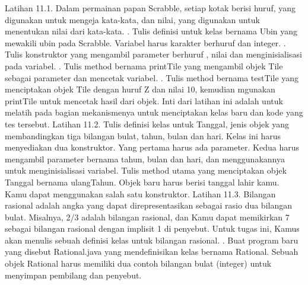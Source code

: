 Latihan 11.1. Dalam permainan papan Scrabble, setiap kotak berisi huruf, yang digunakan untuk mengeja kata-kata, dan nilai, yang digunakan untuk menentukan nilai dari kata-kata.
. Tulis definisi untuk kelas bernama Ubin yang mewakili ubin pada Scrabble. \newline
Variabel harus karakter berhuruf dan integer.
\newline {}. Tulis konstruktor yang mengambil parameter berhuruf , nilai dan menginisialisasi pada variabel.
\newline {}. Tulis method bernama printTile yang mengambil objek Tile sebagai parameter dan mencetak variabel.
\newline {}. Tulis method bernama testTile yang menciptakan objek Tile dengan huruf Z dan nilai 10, kemudian mgunakan printTile untuk mencetak hasil dari objek.
\newline \newline
Inti dari latihan ini adalah untuk melatih pada bagian mekanismenya untuk menciptakan kelas baru dan kode yang tes tersebut.
\newline \newline
Latihan 11.2. Tulis definisi kelas untuk Tanggal, jenis objek yang membandingkan tiga bilangan bulat, tahun, bulan dan hari. Kelas ini harus menyediakan dua konstruktor. Yang pertama harus ada parameter. Kedua harus mengambil parameter bernama tahun, bulan dan hari, dan menggunakannya untuk menginisialisasi variabel.
\newline \newline
Tulis method utama yang menciptakan objek Tanggal bernama ulangTahun. Objek baru harus berisi tanggal lahir kamu. Kamu dapat menggunakan salah satu konstruktor.
\newline \newline
Latihan 11.3. Bilangan rasional adalah angka yang dapat direpresentasikan sebagai rasio dua bilangan bulat. Misalnya, 2/3 adalah bilangan rasional, dan Kamu dapat memikirkan 7 sebagai bilangan rasional dengan implisit 1 di penyebut. Untuk tugas ini, Kamus akan menulis sebuah definisi kelas untuk bilangan rasional.
\newline {}. Buat program baru yang disebut Rational.java yang mendefinisikan kelas bernama Rational. Sebuah objek Rational harus memiliki dua contoh bilangan bulat (integer) untuk menyimpan pembilang dan penyebut.
